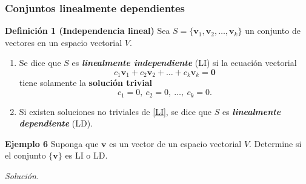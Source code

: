 {\nologo
\begin{frame}\frametitle{Conjuntos linealmente dependientes}
	
	\vspace{-2mm}
	\begin{block}{\textbf{Definición 1 (Independencia lineal)}}
		\justifying
		Sea $S=\{\mathbf{v}_1,\mathbf{v}_2,\hdots,\mathbf{v}_k\}$ un conjunto de vectores
		en un espacio vectorial $V$.
		
		\begin{enumerate}[$a$]%
			\item Se dice que $S$ es \textbf{\textit{linealmente independiente}} (LI) si
			la ecuación vectorial
			\begin{equation}\tag{1}
			c_1\mathbf{v}_1+c_2\mathbf{v}_2+\hdots+c_k\mathbf{v}_k = \mathbf{0}
			\end{equation}
			tiene solamente la \textbf{solución trivial}
			\[
			c_1 =0,\ c_2 =0,\ \hdots,\ c_k=0.
			\]
			
			\item Si existen soluciones no triviales de \eqref{LI}, se dice que $S$ es \textbf{\textit{linealmente dependiente}} (LD).
		\end{enumerate}		
	\end{block}
	
	\begin{ej}{\textbf{Ejemplo 6}} \justifying
		Suponga que $\mathbf{v}$ es un vector de un espacio vectorial $V$.
		Determine si el conjunto $\{\mathbf{v}\}$ es LI o LD.		
	\end{ej}	
	\textit{Solución.}
	
\end{frame}
}


\subsection{}

